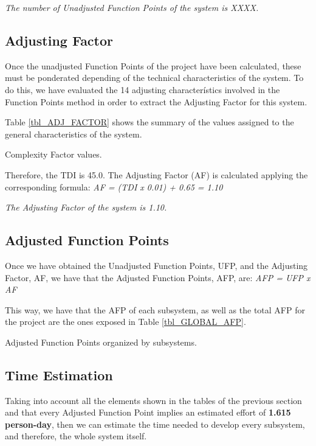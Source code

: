 \emph{The number of Unadjusted Function Points of the system is XXXX.}


\subsection{Adjusting Factor}
Once the unadjusted Function Points of the project have been calculated, these must be ponderated depending of the technical characteristics of the system. To do this, we have evaluated the 14 adjusting characterístics involved in the Function Points method in order to extract the Adjusting Factor for this system.

Table \ref{tbl_ADJ_FACTOR} shows the summary of the values assigned to the general characteristics of the system.

\begin{table}[hbtp]
\centering

\caption{Complexity Factor values.}
\label{tbl_ADJ_FACTOR}
\end{table}

Therefore, the TDI is 45.0. The Adjusting Factor (AF) is calculated applying the corresponding formula:
\emph{AF = (TDI x 0.01) + 0.65 = 1.10}

\emph{The Adjusting Factor of the system is 1.10.}

\subsection{Adjusted Function Points}
Once we have obtained the Unadjusted Function Points, UFP, and the Adjusting Factor, AF, we have that the Adjusted Function Points, AFP, are:
\emph{AFP = UFP x AF}

This way, we have that the AFP of each subsystem, as well as the total AFP for the project are the ones exposed in Table \ref{tbl_GLOBAL_AFP}.

\begin{table}[hbtp]
\centering

\caption{Adjusted Function Points organized by subsystems.}
\label{tbl_GLOBAL_AFP}
\end{table}


\subsection{Time Estimation}

Taking into account all the elements shown in the tables of the previous section and that every Adjusted Function Point implies an estimated effort of \textbf{1.615 person-day}, then we can estimate the time needed to develop every subsystem, and therefore, the whole system itself.

